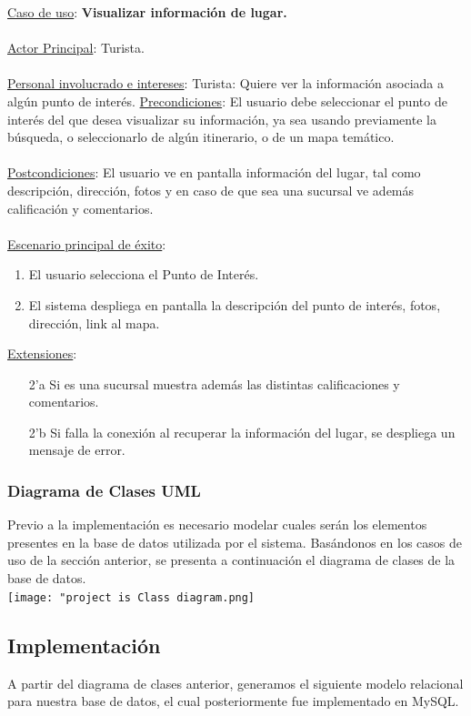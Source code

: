 \documentclass[12pt]{article}
\begin{document}
\underline{Caso de uso}: \textbf{Visualizar información de lugar.}\\\\
\underline{Actor Principal}: Turista.\\\\
\underline{Personal involucrado e intereses}: Turista: Quiere ver la información asociada a algún punto de interés.
\underline{Precondiciones}: El usuario debe seleccionar el punto de interés del que desea visualizar su información, ya sea usando previamente la búsqueda, o seleccionarlo de algún itinerario, o de un mapa temático.\\\\
\underline{Postcondiciones}: El usuario ve en pantalla información del lugar, tal como descripción, dirección, fotos y en caso de que sea una sucursal ve además calificación y comentarios.\\\\
\underline{Escenario principal de éxito}:
\begin{enumerate}
\item El usuario selecciona el Punto de Interés.
\item El sistema despliega en pantalla la descripción del punto de interés, fotos, dirección, link al mapa.
\end{enumerate}
\underline{Extensiones}:
\begin{enumerate}
\item[2'a] Si es una sucursal muestra además las distintas calificaciones y comentarios.
\item[2'b] Si falla la conexión al recuperar la información del lugar, se despliega un mensaje de error.
\end{enumerate}
\subsubsection{Diagrama de Clases UML}
Previo a la implementación es necesario modelar cuales serán los elementos presentes en la base de datos utilizada por el sistema. Basándonos en los casos de uso de la sección anterior, se presenta a continuación el diagrama de clases de la base de datos.\\
\texttt{[image: "project is Class diagram.png]}
\subsection{Implementación}
A partir del diagrama de clases anterior, generamos el siguiente modelo relacional para nuestra base de datos, el cual posteriormente fue implementado en MySQL.
\end{document}
